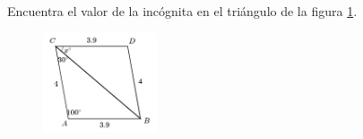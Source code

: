 \question[10]  Encuentra el valor de la incógnita en el triángulo de la figura \ref{fig:angle_triangle_21}.
\begin{figure}[H]
    \begin{center}
        \includegraphics[width=0.3\textwidth]{../images/angle_triangle_21.png}
    \end{center}
    \caption{}
    \label{fig:angle_triangle_21}
\end{figure}